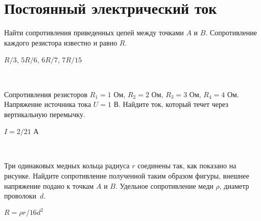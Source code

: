 \section{Постоянный электрический ток}

\begin{ex}
Найти сопротивления приведенных цепей между точками $A$ и $B$. Сопротивление каждого резистора известно и равно $R$.
\begin{center}




\end{center}
\begin{ans}
$R/3$, $5R/6$, $6R/7$, $7R/15$
\end{ans}
\end{ex}

\begin{ex}
\hspace{0pt} \\
\begin{minipage}{.65\textwidth}
Сопротивления резисторов $R_1 = 1$ Ом, $R_2 = 2$ Ом, $R_3 = 3$ Ом, $R_4 =4$ Ом. 
Напряжение источника тока $U = 1$ В. Найдите ток, который течет через вертикальную перемычку.
\end{minipage}
\begin{minipage}{.35\textwidth}
\centering

\end{minipage}
\begin{ans}
$I = 2/21$ А
\end{ans}
\end{ex}

\begin{samepage}
\begin{ex}
\hspace{0pt} \\
\begin{minipage}{.65\textwidth}
Три одинаковых медных кольца радиуса $r$ соединены так, как показано на рисунке. 
Найдите сопротивление полученной таким образом фигуры, внешнее напряжение подано к точкам $A$ и $B$. 
Удельное сопротивление меди $\rho$, диаметр проволоки~$d$.
\end{minipage}
\begin{minipage}{.35\textwidth}
\centering

\end{minipage}
\begin{ans}
$R = \rho r /16d^2$
\end{ans}
\end{ex}
\end{samepage}


